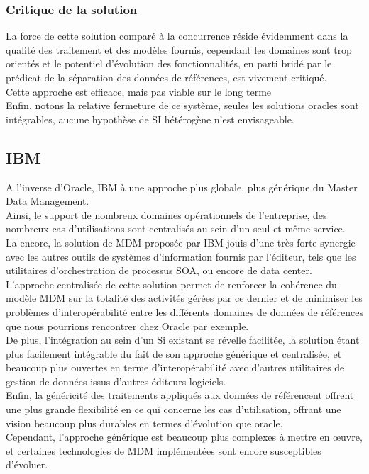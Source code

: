\subsubsection{Critique de la solution}

La force de cette solution comparé à la concurrence réside évidemment dans la qualité des traitement et des modèles fournis, cependant les domaines sont trop orientés et le potentiel d'évolution des fonctionnalités, en parti bridé par le prédicat de la séparation des données de références, est vivement critiqué.\\
Cette approche est efficace, mais pas viable sur le long terme\\ 
Enfin, notons la relative fermeture de ce système, seules les solutions oracles sont intégrables, aucune hypothèse de SI hétérogène n'est envisageable.

\subsection{IBM}

A l'inverse d'Oracle, IBM à une approche plus globale, plus générique du Master Data Management.\\
Ainsi, le support de nombreux domaines opérationnels de l'entreprise, des nombreux cas d'utilisations sont centralisés au sein d'un seul et même service.\\
La encore, la solution de MDM proposée par IBM jouis d'une très forte synergie avec les autres outils de systèmes d'information fournis par l'éditeur, tels que les utilitaires d'orchestration de processus SOA, ou encore de data center.\\
L'approche centralisée de cette solution permet de renforcer la cohérence du modèle MDM sur la totalité des activités gérées par ce dernier et de minimiser les problèmes d'interopérabilité entre les différents domaines de données de références que nous pourrions rencontrer chez Oracle par exemple.\\
De plus, l'intégration au sein d'un Si existant se révelle facilitée, la solution étant plus facilement intégrable du fait de son approche générique et centralisée, et beaucoup plus ouvertes en terme d'interopérabilité avec d'autres utilitaires de gestion de données issus d'autres éditeurs logiciels.\\
Enfin, la généricité des traitements appliqués aux données de référencent offrent  une plus grande flexibilité en ce qui concerne les cas d'utilisation, offrant une vision beaucoup plus durables en termes d'évolution que oracle.\\
Cependant, l'approche générique est beaucoup plus complexes à mettre en œuvre, et certaines technologies de MDM implémentées sont encore susceptibles d'évoluer.\\
